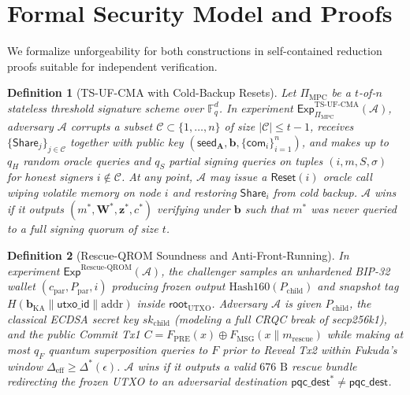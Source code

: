 \documentclass[conference,compsoc]{IEEEtran}
\newtheorem{definition}{Definition}
\begin{document}
\section{Formal Security Model and Proofs}
\label{sec:security}

We formalize unforgeability for both constructions in self-contained reduction proofs suitable for independent verification.

\begin{definition}[TS-UF-CMA with Cold-Backup Resets]
Let $\Pi_{\mathrm{MPC}}$ be a $t$-of-$n$ stateless threshold signature scheme over $\mathbb{F}_q^d$. In experiment $\mathsf{Exp}^{\mathrm{TS\text{-}UF\text{-}CMA}}_{\Pi_{\mathrm{MPC}}}(\mathcal{A})$, adversary $\mathcal{A}$ corrupts a subset $\mathcal{C} \subset \{1, \dots, n\}$ of size $|\mathcal{C}| \le t - 1$, receives $\{\mathsf{Share}_j\}_{j \in \mathcal{C}}$ together with public key $(\mathsf{seed}_{\mathbf{A}}, \mathbf{b}, \{\mathsf{com}_i\}_{i=1}^n)$, and makes up to $q_H$ random oracle queries and $q_S$ partial signing queries on tuples $(i, m, S, \sigma)$ for honest signers $i \notin \mathcal{C}$. At any point, $\mathcal{A}$ may issue a $\mathsf{Reset}(i)$ oracle call wiping volatile memory on node $i$ and restoring $\mathsf{Share}_i$ from cold backup. $\mathcal{A}$ wins if it outputs $(m^*, \mathbf{W}^*, \mathbf{z}^*, c^*)$ verifying under $\mathbf{b}$ such that $m^*$ was never queried to a full signing quorum of size $t$.
\end{definition}

\begin{definition}[Rescue-QROM Soundness and Anti-Front-Running]
In experiment $\mathsf{Exp}^{\mathrm{Rescue\text{-}QROM}}(\mathcal{A})$, the challenger samples an unhardened BIP-32 wallet $(c_{\mathrm{par}}, P_{\mathrm{par}}, i)$ producing frozen output $\mathrm{Hash160}(P_{\mathrm{child}})$ and snapshot tag $H(\mathbf{b}_{\mathrm{KA}} \parallel \mathsf{utxo\_id} \parallel \mathrm{addr})$ inside $\mathsf{root}_{\mathrm{UTXO}}$. Adversary $\mathcal{A}$ is given $P_{\mathrm{child}}$, the classical ECDSA secret key $sk_{\mathrm{child}}$ (modeling a full CRQC break of secp256k1), and the public Commit Tx1 $C = F_{\mathrm{PRE}}(x) \oplus F_{\mathrm{MSG}}(x \parallel m_{\mathrm{rescue}})$ while making at most $q_F$ quantum superposition queries to $F$ prior to Reveal Tx2 within Fukuda's window $\Delta_{\text{eff}} \ge \Delta^*(\epsilon)$. $\mathcal{A}$ wins if it outputs a valid $676\text{ B}$ rescue bundle redirecting the frozen UTXO to an adversarial destination $\mathsf{pqc\_dest}^* \ne \mathsf{pqc\_dest}$.
\end{definition}
\end{document}
